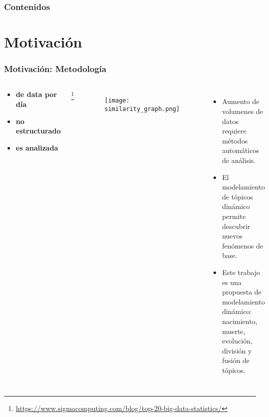 \documentclass[
	spanish, %
	aspectratio=43, %
	hyperref={pdfencoding=auto,psdextra},
	xcolor={dvipsnames,table,usenames},
]{beamer}
\title[\documentsubtitle]{\documenttitle}
\subtitle{\documentsubject}
\author[\documentauthor]{
	\documentauthor \newline\newline
Profesor guía: Richard Weber \newline
Miembros de la comisión: Ángel Jiménez, Giorgiogiulio Parra
}
\institute[UChile]{
	\texttt{[image: \\universitydepartmentimage]} \\
	\medskip
	\universityname \\
	\universityfaculty \\
	\universitydepartment
}
\date[\today]{\footnotesize{\today}}
\begin{document}
\templatePagecfg

\templateFinalcfg

\newcommand\blfootnote[1]{%
  \begingroup
  \renewcommand\thefootnote{}\footnote{#1}%
  \addtocounter{footnote}{-1}%
  \endgroup
}

\begin{frame}
	\titlepage
\end{frame}


\begin{frame}
	\frametitle{Contenidos}
	\tableofcontents
\end{frame}


\section{Motivación}

\begin{frame}[t]
\frametitle{Motivación: Metodología} 
\begin{columns}[t]
  \begin{center}
    \begin{minipage}{0.8\textwidth}
    \begin{itemize}
    \item[] \textbf{\scalebox{1.5}{\textcolor{royalblue}{2 EB}} de data por día} %
    \item[] \textbf{\scalebox{1.5}{\textcolor{royalblue}{80\%}} no estructurado}
    \item[] \textbf{\scalebox{1.5}{\textcolor{royalblue}{12\%}} es analizada}
    \end{itemize}
    \end{minipage}
   \end{center}
  \blfootnote{\url{https://www.sigmacomputing.com/blog/top-20-big-data-statistics/}}
  
  \vspace*{-0.2in}
  \begin{figure}
  \texttt{[image: similarity\_graph.png]} 
  \end{figure}

  \begin{itemize}
    \item Aumento de volumenes de datos requiere métodos automáticos de análisis. 
    \item El modelamiento de tópicos dinámico permite descubrir nuevos fenómenos de base.%
    \item Este trabajo es una propuesta de modelamiento dinámico: nacimiento, muerte, evolución, división y fusión de tópicos.
  \end{itemize}
\end{columns}
\end{frame}
\end{document}
